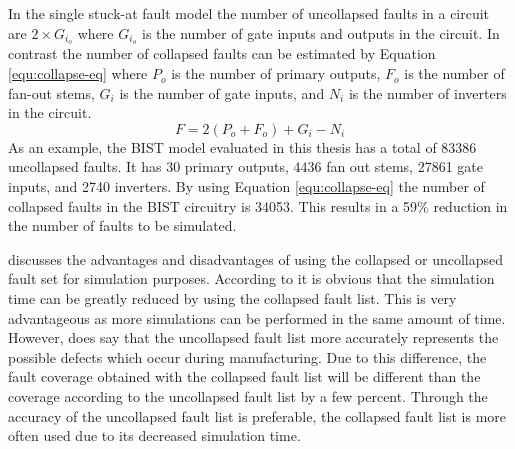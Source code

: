\documentclass[12pt]{report}
\begin{document}
In the single stuck-at fault model the number of uncollapsed faults in a circuit are $2 \times G_i_o$ where $G_i_o$ is the number of gate inputs and outputs in the circuit\cite{stroud}.  In contrast the number of collapsed faults can be estimated by Equation \ref{equ:collapse-eq} where $P_o$ is the number of primary outputs, $F_o$ is the number of fan-out stems, $G_i$ is the number of gate inputs, and $N_i$ is the number of inverters in the circuit\cite{stroud}.
\begin{equation}
F = 2(P_o + F_o) + G_i - N_i
\label{equ:collapse-eq}
\end{equation}
As an example, the BIST model evaluated in this thesis has a total of 83386 uncollapsed faults.  It has 30 primary outputs, 4436 fan out stems, 27861 gate inputs, and 2740 inverters.  By using Equation \ref{equ:collapse-eq} the number of collapsed faults in the BIST circuitry is 34053.  This results in a 59\% reduction in the number of faults to be simulated.  

\cite{stroud} discusses the advantages and disadvantages of using the collapsed or uncollapsed fault set for simulation purposes.  According to \cite{stroud} it is obvious that the simulation time can be greatly reduced by using the collapsed fault list.  This is very advantageous as more simulations can be performed in the same amount of time.  However, \cite{stroud} does say that the uncollapsed fault list more accurately represents the possible defects which occur during manufacturing.  Due to this difference, the fault coverage obtained with the collapsed fault list will be different than the coverage according to the uncollapsed fault list by a few percent\cite{stroud}.  Through the accuracy of the uncollapsed fault list is preferable, the collapsed fault list is more often used due to its decreased simulation time\cite{stroud}.
\end{document}
